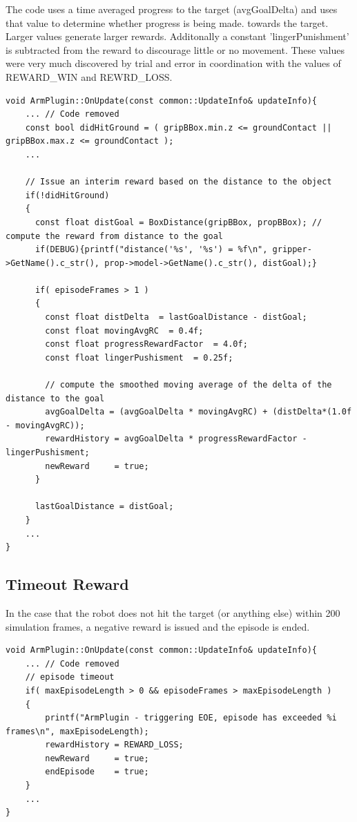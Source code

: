 \documentclass[10pt]{article}
\begin{document}
The code uses a time averaged progress to the target (avgGoalDelta) and uses that value to  determine whether progress is being made. 
towards the target. Larger values generate larger rewards. Additonally a constant 'lingerPunishment' is subtracted from the reward
to discourage little or no movement. 
These values were very much discovered by trial and error in coordination with the values of REWARD\_WIN and REWRD\_LOSS.
\begin{lstlisting}
void ArmPlugin::OnUpdate(const common::UpdateInfo& updateInfo){
    ... // Code removed
    const bool didHitGround = ( gripBBox.min.z <= groundContact || gripBBox.max.z <= groundContact );
    ...

    // Issue an interim reward based on the distance to the object
    if(!didHitGround)
    {
      const float distGoal = BoxDistance(gripBBox, propBBox); // compute the reward from distance to the goal
      if(DEBUG){printf("distance('%s', '%s') = %f\n", gripper->GetName().c_str(), prop->model->GetName().c_str(), distGoal);}

      if( episodeFrames > 1 )
      {
        const float distDelta  = lastGoalDistance - distGoal;
        const float movingAvgRC  = 0.4f;
        const float progressRewardFactor  = 4.0f;
        const float lingerPushisment  = 0.25f;

        // compute the smoothed moving average of the delta of the distance to the goal
        avgGoalDelta = (avgGoalDelta * movingAvgRC) + (distDelta*(1.0f - movingAvgRC));
        rewardHistory = avgGoalDelta * progressRewardFactor - lingerPushisment;
        newReward     = true;
      }

      lastGoalDistance = distGoal;
    }
    ...
}
\end{lstlisting}

\subsection{Timeout Reward}
In the case that the robot does not hit the target (or anything else) within 200 simulation frames, a negative reward is issued and 
the episode is ended.

\begin{lstlisting}
void ArmPlugin::OnUpdate(const common::UpdateInfo& updateInfo){
    ... // Code removed
    // episode timeout
    if( maxEpisodeLength > 0 && episodeFrames > maxEpisodeLength )
    {
        printf("ArmPlugin - triggering EOE, episode has exceeded %i frames\n", maxEpisodeLength);
        rewardHistory = REWARD_LOSS;
        newReward     = true;
        endEpisode    = true;
    }
    ...
}
\end{lstlisting}
 
\end{document}
